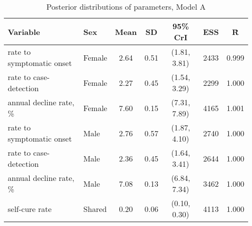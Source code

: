 \begin{table}[h]

\caption{\label{tab:}Posterior distributions of parameters, Model A}
\centering
\begin{tabular}[t]{llccccc}
\toprule
Variable & Sex & Mean & SD & 95\% CrI & ESS & \^{R}\\
\midrule
rate to symptomatic onset & Female & 2.64 & 0.51 & (1.81, 3.81) & 2433 & 0.999\\
rate to case-detection & Female & 2.27 & 0.45 & (1.54, 3.29) & 2299 & 1.000\\
annual decline rate, \% & Female & 7.60 & 0.15 & (7.31, 7.89) & 4165 & 1.001\\
\addlinespace
rate to symptomatic onset & Male & 2.76 & 0.57 & (1.87, 4.10) & 2740 & 1.000\\
rate to case-detection & Male & 2.36 & 0.45 & (1.64, 3.41) & 2644 & 1.000\\
annual decline rate, \% & Male & 7.08 & 0.13 & (6.84, 7.34) & 3462 & 1.000\\
\addlinespace
self-cure rate & Shared & 0.20 & 0.06 & (0.10, 0.30) & 4113 & 1.000\\
\bottomrule
\end{tabular}
\end{table}
